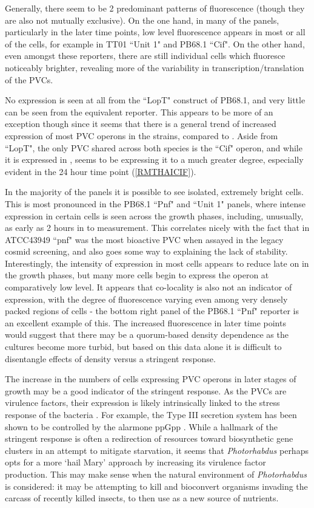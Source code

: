 Generally, there seem to be 2 predominant patterns of fluorescence (though they are also not mutually exclusive). On the one hand, in many of the panels, particularly in the later time points, low level fluorescence appears in most or all of the cells, for example in \Plum{} TT01 ``Unit 1" and \Pasy{} PB68.1 ``Cif". On the other hand, even amongst these reporters, there are still individual cells which fluoresce noticeably brighter, revealing more of the variability in transcription/translation of the PVCs.

No expression is seen at all from the ``LopT" construct of PB68.1, and very little can be seen from the equivalent \Plum{} reporter. This appears to be more of an exception though since it seems that there is a general trend of increased expression of most PVC operons in the \Pasy{} strains, compared to \Plum. Aside from ``LopT", the only PVC shared across both species is the ``Cif" operon, and while it is expressed in \Plum, \Pasy{} seems to be expressing it to a much greater degree, especially evident in the 24 hour time point (\vref{RMTHAICIF}).

In the majority of the panels it is possible to see isolated, extremely bright cells. This is most pronounced in the \Pasy{} PB68.1 ``Pnf" and ``Unit 1" panels, where intense expression in certain cells is seen across the growth phases, including, unusually, as early as 2 hours in to measurement. This correlates nicely with the fact that in \Pasy{} ATCC43949 ``pnf" was the most bioactive PVC when assayed in the legacy cosmid screening, and also goes some way to explaining the lack of stability. Interestingly, the intensity of expression in most cells appears to reduce late on in the growth phases, but many more cells begin to express the operon at comparatively low level. It appears that co-locality is also not an indicator of expression, with the degree of fluorescence varying even among very densely packed regions of cells - the bottom right panel of the PB68.1 ``Pnf" reporter is an excellent example of this. The increased fluorescence in later time points would suggest that there may be a quorum-based density dependence as the cultures become more turbid, but based on this data alone it is difficult to disentangle effects of density versus a stringent response.

The increase in the numbers of cells expressing PVC operons in later stages of growth may be a good indicator of the stringent response. As the PVCs are virulence factors, their expression is likely intrinsically linked to the stress response of the bacteria \citep{Dalebroux2010, Chatnaparat2015 }. For example, the Type III secretion system has been shown to be controlled by the alarmone ppGpp \citep{Ancona2015}. While a hallmark of the stringent response is often a redirection of resources toward biosynthetic gene clusters in an attempt to mitigate starvation, it seems that \emph{Photorhabdus} perhaps opts for a more `hail Mary' approach by increasing its virulence factor production. This may make sense when the natural environment of \emph{Photorhabdus} is considered: it may be attempting to kill and bioconvert organisms invading the carcass of recently killed insects, to then use as a new source of nutrients.

